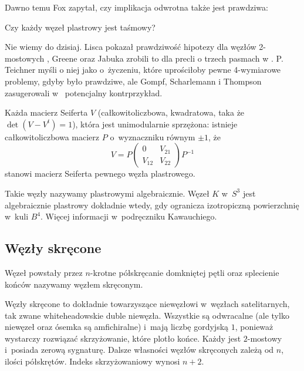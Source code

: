 Dawno temu Fox zapytał, czy implikacja odwrotna także jest prawdziwa:

\begin{conjecture}
    Czy każdy węzeł plastrowy jest taśmowy?
\end{conjecture}

Nie wiemy do dzisiaj.
Lisca pokazał prawdziwość hipotezy dla węzłów 2-mostowych \cite{lisca07}, Greene oraz Jabuka zrobili to dla precli o trzech pasmach w \cite{greene11}.
P. Teichner myśli o niej jako o~życzeniu, które uprościłoby pewne 4-wymiarowe problemy, gdyby było prawdziwe, ale Gompf, Scharlemann i Thompson zasugerowali w~\cite{gompf10} potencjalny kontrprzykład.


\begin{proposition}
    Każda macierz Seiferta $V$ (całkowitoliczbowa, kwadratowa, taka że $\det (V - V^t) = 1$), która jest unimodularnie sprzężona: istnieje całkowitoliczbowa macierz $P$ o~wyznaczniku równym $\pm 1$, że
    \begin{equation}
        V = P \begin{pmatrix} 0 & V_{21} \\ V_{12} & V_{22} \end{pmatrix} P^{-1}
    \end{equation}
    stanowi macierz Seiferta pewnego węzła plastrowego.
\end{proposition}

Takie węzły nazywamy plastrowymi algebraicznie.
Węzeł $K$ w~$S^3$ jest algebraicznie plastrowy dokładnie wtedy, gdy ogranicza izotropiczną powierzchnię w~kuli $B^4$.
Więcej informacji w~podręczniku Kawauchiego.


\subsection{Węzły skręcone}
\begin{definition} \label{twist_knots}
    Węzeł powstały przez $n$-krotne półskręcanie domkniętej pętli oraz splecienie końców nazywamy węzłem skręconym.
\end{definition}

Węzły skręcone to dokładnie towarzyszące niewęzłowi w~węzłach satelitarnych, tak zwane whiteheadowskie duble niewęzła.
Wszystkie są odwracalne (ale tylko niewęzeł oraz ósemka są amfichiralne) i~mają liczbę gordyjską $1$, ponieważ wystarczy rozwiązać skrzyżowanie, które plotło końce.
Każdy jest $2$-mostowy i~posiada zerową sygnaturę.
Dalsze własności węzłów skręconych zależą od $n$, ilości półskrętów.
Indeks skrzyżowaniowy wynosi $n + 2$.

